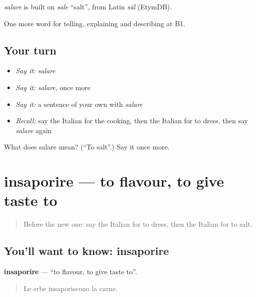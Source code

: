 \begin{cousinweb}
\emph{salare} is built on \emph{sale} \textquotedblleft{}salt\textquotedblright{}, from Latin \emph{sāl} (EtymDB).
\end{cousinweb}

\begin{grammarlens}[title={What you've built}]
One more word for telling, explaining and describing at B1.
\end{grammarlens}

\subsection*{Your turn}
\begin{itemize}
\raggedright
  \item \emph{Say it:} \emph{salare}
  \item \emph{Say it:} \emph{salare}, once more
  \item \emph{Say it:} a sentence of your own with \emph{salare}
  \item \emph{Recall:} say the Italian for the cooking, then the Italian for to dress, then say \emph{salare} again
\end{itemize}

\begin{tcolorbox}[breakable,colback=teal!4,colframe=teal!35!black,title={Before you move on}]
What does salare mean? (\textquotedblleft{}To salt\textquotedblright{}.) Say it once more.
\end{tcolorbox}
\section[insaporire]{insaporire — to flavour, to give taste to}

\label{lesson:IT-C337-insaporire}



\begin{quote}
Before the new one: say the Italian for to dress, then the Italian for to salt.
\end{quote}

\subsection*{You'll want to know: insaporire}
\textbf{insaporire} — \textquotedblleft{}to flavour, to give taste to\textquotedblright{}.

\begin{quote}
Le erbe insaporiscono la carne.
\end{quote}

